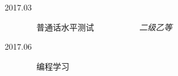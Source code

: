 \begin{tcolorbox}[colback=red!58!yellow,colframe=red!80!black]
    \begin{description}
        \item [2017.03] ~~普通话水平测试~~~~~~~~~~~\emph{二级乙等}
        \item [2017.06] ~~编程学习
    \end{description}
\end{tcolorbox}